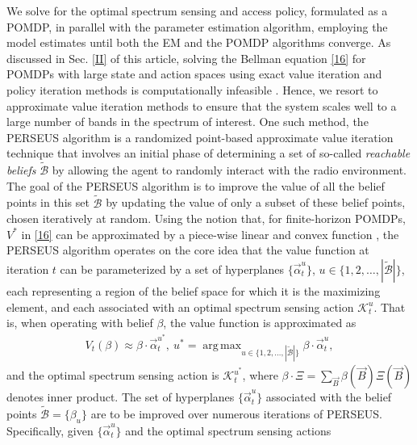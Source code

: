 \documentclass[10pt,twocolumn]{IEEEtran}
\DeclareMathOperator*{\argmax}{arg\,max}
\begin{document}
We solve for the optimal spectrum sensing and access policy, formulated as a POMDP, in parallel with the parameter estimation algorithm, employing the model estimates until both the EM and the POMDP algorithms converge. As discussed in Sec. \ref{II} of this article, solving the Bellman equation \eqref{16} for POMDPs with large state and action spaces using exact value iteration and policy iteration methods is computationally infeasible \cite{DBLP:journals/corr/abs-1109-2145}. Hence, we resort to approximate value iteration methods to ensure that the system scales well to a large number of bands in the spectrum of interest. One such method, the PERSEUS algorithm \cite{DBLP:journals/corr/abs-1109-2145} is a randomized point-based approximate value iteration technique that involves an initial phase of determining a set of so-called \emph{reachable beliefs} $\tilde{\mathcal{B}}$ by allowing the agent to randomly interact with the radio environment. The goal of the PERSEUS algorithm is to improve the value of all the belief points in this set $\tilde{\mathcal{B}}$ by updating the value of only a subset of these belief points, chosen iteratively at random. Using the notion that, for finite-horizon POMDPs, $V^*$ in \eqref{16} can be approximated by a piece-wise linear and convex function \cite{DBLP:journals/corr/abs-1109-2145}, the PERSEUS algorithm operates on the core idea that the value function at iteration $t$ can be parameterized by a set of hyperplanes $\{\vec{\alpha}_{t}^{u}\}$, $u {\in} \{1,2,\dots,|\tilde{\mathcal{B}}|\}$, each representing a region of the belief space for which it is the maximizing element, and each associated with an optimal spectrum sensing action $\mathcal K_t^{u}$. That is, when operating with belief $\beta$, the value function is approximated as
\begin{equation}
    \begin{aligned}\label{40}
        V_{t}(\beta) \approx \beta \cdot \vec{\alpha}_{t}^{u^*},
        \ 
        u^* = \argmax_{u\in\{1,2,\dots,|\tilde{\mathcal{B}}|\}} \beta \cdot \vec{\alpha}_{t}^{u},
    \end{aligned}
\end{equation}
and the optimal spectrum sensing action is $\mathcal K_t^{u^*}$, where $\beta\cdot\Xi{=}\sum_{\vec{B}}\beta(\vec{B})\Xi(\vec{B})$ denotes inner product. The set of hyperplanes $\{\vec{\alpha}_{t}^{u}\}$ associated with the belief points $\tilde{\mathcal{B}}{=}\{\beta_u\}$ are to be improved over numerous iterations of PERSEUS. Specifically, given $\{\vec{\alpha}_{t}^{u}\}$ and the optimal spectrum sensing actions
\end{document}
